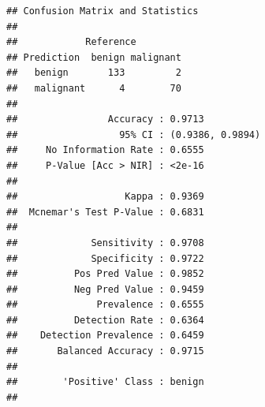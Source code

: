 \documentclass[]{article}
\newenvironment{Shaded}{\begin{snugshade}}{\end{snugshade}}
\newcommand{\KeywordTok}[1]{\textcolor[rgb]{0.13,0.29,0.53}{\textbf{{#1}}}}
\newcommand{\DataTypeTok}[1]{\textcolor[rgb]{0.13,0.29,0.53}{{#1}}}
\newcommand{\FloatTok}[1]{\textcolor[rgb]{0.00,0.00,0.81}{{#1}}}
\newcommand{\StringTok}[1]{\textcolor[rgb]{0.31,0.60,0.02}{{#1}}}
\newcommand{\OtherTok}[1]{\textcolor[rgb]{0.56,0.35,0.01}{{#1}}}
\newcommand{\NormalTok}[1]{{#1}}
\begin{document}
\begin{Shaded}
\end{Shaded}

\begin{verbatim}
## Confusion Matrix and Statistics
## 
##            Reference
## Prediction  benign malignant
##   benign       133         2
##   malignant      4        70
##                                           
##                Accuracy : 0.9713          
##                  95% CI : (0.9386, 0.9894)
##     No Information Rate : 0.6555          
##     P-Value [Acc > NIR] : <2e-16          
##                                           
##                   Kappa : 0.9369          
##  Mcnemar's Test P-Value : 0.6831          
##                                           
##             Sensitivity : 0.9708          
##             Specificity : 0.9722          
##          Pos Pred Value : 0.9852          
##          Neg Pred Value : 0.9459          
##              Prevalence : 0.6555          
##          Detection Rate : 0.6364          
##    Detection Prevalence : 0.6459          
##       Balanced Accuracy : 0.9715          
##                                           
##        'Positive' Class : benign          
## 
\end{verbatim}

\begin{Shaded}
\end{Shaded}
\end{document}
